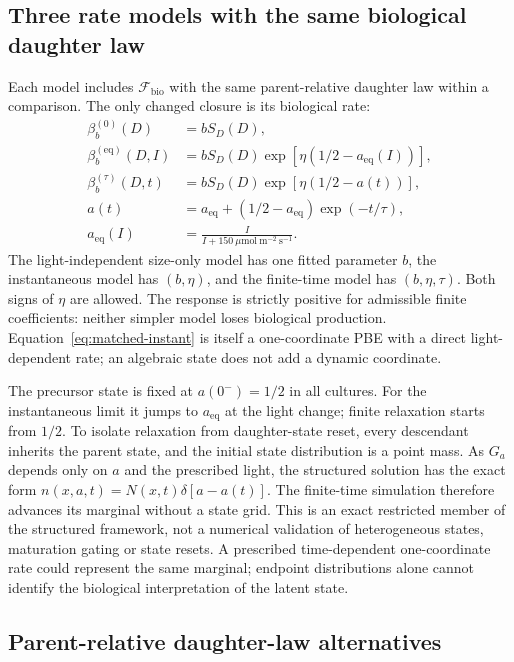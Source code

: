\subsection{Three rate models with the same biological daughter law}

Each model includes $\mathcal F_{\mathrm{bio}}$ with the same parent-relative daughter law within a comparison. The only changed closure is its biological rate:
\begin{align}
 \beta_b^{(0)}(D)&=bS_D(D),\label{eq:matched-size-only}\\
 \beta_b^{(\mathrm{eq})}(D,I)&=bS_D(D)\exp[\eta(1/2-a_{\mathrm{eq}}(I))],\label{eq:matched-instant}\\
 \beta_b^{(\tau)}(D,t)&=bS_D(D)\exp[\eta(1/2-a(t))],\label{eq:matched-finite}\\
 a(t)&=a_{\mathrm{eq}}+(1/2-a_{\mathrm{eq}})\exp(-t/\tau),\nonumber\\
 a_{\mathrm{eq}}(I)&=\frac{I}{I+150~\mu\mathrm{mol~m^{-2}~s^{-1}}}.\label{eq:matched-equilibrium}
\end{align}
The light-independent size-only model has one fitted parameter $b$, the instantaneous model has $(b,\eta)$, and the finite-time model has $(b,\eta,\tau)$. Both signs of $\eta$ are allowed. The response is strictly positive for admissible finite coefficients: neither simpler model loses biological production. Equation~\eqref{eq:matched-instant} is itself a one-coordinate PBE with a direct light-dependent rate; an algebraic state does not add a dynamic coordinate.

The precursor state is fixed at $a(0^-)=1/2$ in all cultures. For the instantaneous limit it jumps to $a_{\mathrm{eq}}$ at the light change; finite relaxation starts from $1/2$. To isolate relaxation from daughter-state reset, every descendant inherits the parent state, and the initial state distribution is a point mass. As $G_a$ depends only on $a$ and the prescribed light, the structured solution has the exact form $n(x,a,t)=N(x,t)\delta[a-a(t)]$. The finite-time simulation therefore advances its marginal without a state grid. This is an exact restricted member of the structured framework, not a numerical validation of heterogeneous states, maturation gating or state resets. A prescribed time-dependent one-coordinate rate could represent the same marginal; endpoint distributions alone cannot identify the biological interpretation of the latent state.

\subsection{Parent-relative daughter-law alternatives}

